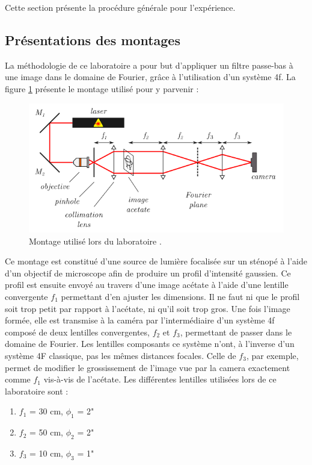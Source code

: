 \documentclass[11pt,letterpaper]{article}
\begin{document}
Cette section présente la procédure générale pour l'expérience.

\subsection{Présentations des montages}
La méthodologie de ce laboratoire a pour but d'appliquer un filtre passe-bas à une image dans le domaine de Fourier, grâce à l'utilisation d'un système 4f. La figure \ref{montage} présente le montage utilisé pour y parvenir : 

\begin{figure}[H]
  \centering
  \includegraphics[scale=0.8]{montage.png}
  \caption{Montage utilisé lors du laboratoire \cite{sheehy_experience_2024}.}
  \label{montage}
\end{figure}

Ce montage est constitué d'une source de lumière focalisée sur un sténopé à l'aide d'un objectif de microscope afin de produire un profil d'intensité gaussien. Ce profil est ensuite envoyé au travers d'une image acétate à l'aide d'une lentille convergente $f_1$ permettant d'en ajuster les dimensions. Il ne faut ni que le profil soit trop petit par rapport à l'acétate, ni qu'il soit trop gros. Une fois l'image formée, elle est transmise à la caméra par l'intermédiaire d'un système 4f composé de deux lentilles convergentes, $f_2$ et $f_3$, permettant de passer dans le domaine de Fourier. Les lentilles composants ce système n'ont, à l'inverse d'un système 4F classique, pas les mêmes distances focales. Celle de $f_3$, par exemple, permet de modifier le grossissement de l'image vue par la camera exactement comme $f_1$ vis-à-vis de l'acétate. Les différentes lentilles utilisées lors de ce laboratoire sont : 

\begin{enumerate}
    \item $f_1$ = 30 cm, $\phi_1$ = 2"
    \item $f_2$ = 50 cm, $\phi_2$ = 2"
    \item $f_3$ = 10 cm, $\phi_3$ = 1"
\end{enumerate}
\end{document}
